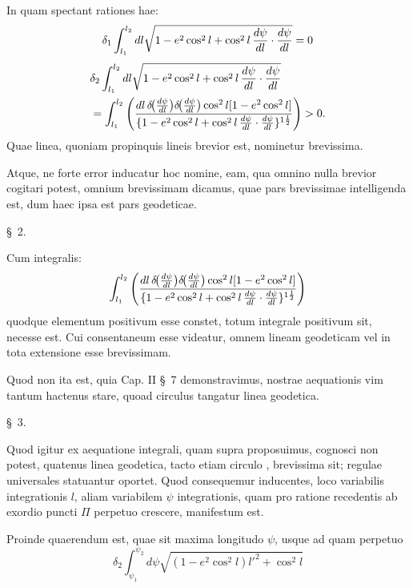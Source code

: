 In quam spectant rationes hae:
\[
 \delta_1\int_{l_1}^{l_2}dl\sqrt{1-e^2\cos^2l+\cos^2l\,{d\psi\over dl}\cdot{d\psi\over dl}}=0
\]
\[
\begin{aligned}
&\delta_2\int_{l_1}^{l_2}dl\sqrt{1-e^2\cos^2l+\cos^2l\,{d\psi\over dl}\cdot{d\psi\over dl}}\\
&=\int_{l_1}^{l_2}\left(
{dl\,\delta\!\bigl({d\psi\over dl}\bigr)\delta\!\bigl({d\psi\over dl}\bigr)\cos^2l[1-e^2\cos^2l]
\over \{1-e^2\cos^2l+\cos^2l\,{d\psi\over dl}\cdot{d\psi\over dl}\}^{1\frac12}}
\right)>0.
\end{aligned}
\]
Quae linea, quoniam propinquis lineis brevior est, nominetur brevissima.

Atque, ne forte error inducatur hoc nomine, eam, qua omnino nulla brevior cogitari potest, omnium brevissimam dicamus, quae pars brevissimae intelligenda est, dum haec ipsa est pars geodeticae.

\begin{center}\S\ 2.\end{center}

Cum integralis:
\[
 \int_{l_1}^{l_2}\left(
{dl\,\delta\!\bigl({d\psi\over dl}\bigr)\delta\!\bigl({d\psi\over dl}\bigr)\cos^2l[1-e^2\cos^2l]
\over \{1-e^2\cos^2l+\cos^2l\,{d\psi\over dl}\cdot{d\psi\over dl}\}^{1\frac12}}
\right)
\]
quodque elementum positivum esse constet, totum integrale positivum sit, necesse est. Cui consentaneum esse videatur, omnem lineam geodeticam vel in tota extensione esse brevissimam.

Quod non ita est, quia Cap. II \S\ 7 demonstravimus, nostrae aequationis vim tantum hactenus stare, quoad circulus  tangatur linea geodetica.

\begin{center}\S\ 3.\end{center}

Quod igitur ex aequatione integrali, quam supra proposuimus, cognosci non potest, quatenus linea geodetica, tacto etiam circulo , brevissima sit; regulae universales statuantur oportet. Quod consequemur inducentes, loco variabilis integrationis $l$, aliam variabilem $\psi$ integrationis, quam pro ratione recedentis ab exordio puncti $\Pi$ perpetuo crescere, manifestum est.

Proinde quaerendum est, quae sit maxima longitudo $\psi$, usque ad quam perpetuo
\[
 \delta_2\int_{\psi_1}^{\psi_2}d\psi\sqrt{(1-e^2\cos^2l)l'^2+\cos^2l}
\]
